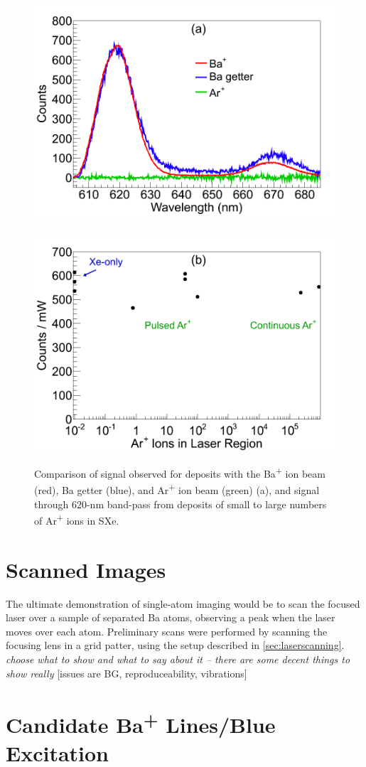 \begin{figure} %
        \centering
                \includegraphics[width=.5\textwidth]{figures/Ar_vs_Ba.png}
                ~
                \includegraphics[width=.5\textwidth]{figures/ArImaging.png}
                \caption{Comparison of signal observed for deposits with the Ba\textsuperscript{+} ion beam (red), Ba getter (blue), and Ar\textsuperscript{+} ion beam (green) (a), and signal through 620-nm band-pass from deposits of small to large numbers of Ar\textsuperscript{+} ions in SXe.}
\label{fig:ArVsBa}
\end{figure}


\section{Scanned Images}
\label{sec:scanning}

The ultimate demonstration of single-atom imaging would be to scan the focused laser over a sample of separated Ba atoms, observing a peak when the laser moves over each atom.  Preliminary scans were performed by scanning the focusing lens in a grid patter, using the setup described in \ref{sec:laserscanning}.   \emph{\color{gray}choose what to show and what to say about it -- there are some decent things to show really}  [issues are BG, reproduceability, vibrations]

\section{Candidate Ba\textsuperscript{+} Lines/Blue Excitation}
\label{sec:BaPlus}

